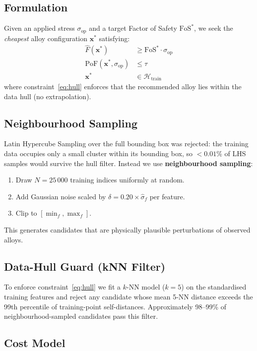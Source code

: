 \documentclass[12pt,a4paper]{article}
\begin{document}
\subsection{Formulation}

Given an applied stress $\sigma_{\text{op}}$ and a target Factor of Safety $\text{FoS}^* $, we
seek the \textit{cheapest} alloy configuration $\mathbf{x}^*$ satisfying:
\begin{align}
  \hat{F}(\mathbf{x}^*) &\geq \text{FoS}^* \cdot \sigma_{\text{op}} \label{eq:fos}\\
  \text{PoF}(\mathbf{x}^*, \sigma_{\text{op}}) &\leq \tau \label{eq:pof}\\
  \mathbf{x}^* &\in \mathcal{H}_{\text{train}} \label{eq:hull}
\end{align}
where constraint~\eqref{eq:hull} enforces that the recommended alloy lies within the data hull
(no extrapolation).

\subsection{Neighbourhood Sampling}

Latin Hypercube Sampling over the full bounding box was rejected: the training data occupies only
a small cluster within its bounding box, so $<0.01\%$ of LHS samples would survive the hull
filter. Instead we use \textbf{neighbourhood sampling}:
\begin{enumerate}[nosep]
  \item Draw $N=25\,000$ training indices uniformly at random.
  \item Add Gaussian noise scaled by $\delta = 0.20 \times \hat{\sigma}_f$ per feature.
  \item Clip to $[\min_f, \max_f]$.
\end{enumerate}
This generates candidates that are physically plausible perturbations of observed alloys.

\subsection{Data-Hull Guard (kNN Filter)}

To enforce constraint~\eqref{eq:hull} we fit a $k$-NN model ($k=5$) on the standardised training
features and reject any candidate whose mean 5-NN distance exceeds the 99th percentile of
training-point self-distances. Approximately 98--99\% of neighbourhood-sampled candidates pass
this filter.

\subsection{Cost Model}
\end{document}
